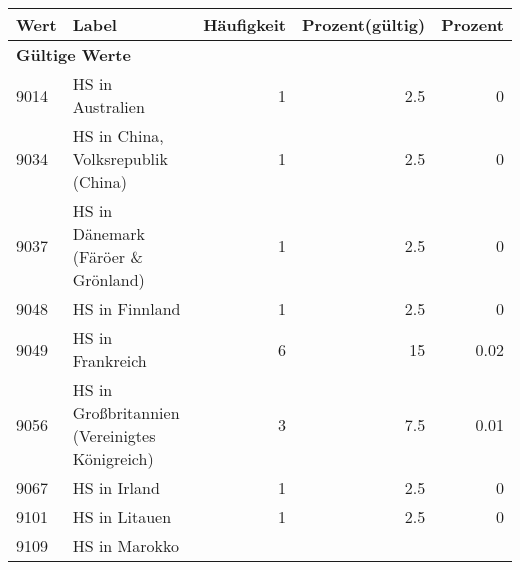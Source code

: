      \begin{longtable}{lXrrr}
     \toprule
     \textbf{Wert} & \textbf{Label} & \textbf{Häufigkeit} & \textbf{Prozent(gültig)} & \textbf{Prozent} \\
     \endhead
     \midrule
     \multicolumn{5}{l}{\textbf{Gültige Werte}}\\
        9014 & \multicolumn{1}{X}{HS in Australien} & %
          \num{1} &
          \num[round-mode=places,round-precision=2]{2.5} &
          \num[round-mode=places,round-precision=2]{0} \\
        9034 & \multicolumn{1}{X}{HS in China, Volksrepublik (China)} & %
          \num{1} &
          \num[round-mode=places,round-precision=2]{2.5} &
          \num[round-mode=places,round-precision=2]{0} \\
        9037 & \multicolumn{1}{X}{HS in Dänemark (Färöer \& Grönland)} & %
          \num{1} &
          \num[round-mode=places,round-precision=2]{2.5} &
          \num[round-mode=places,round-precision=2]{0} \\
        9048 & \multicolumn{1}{X}{HS in Finnland} & %
          \num{1} &
          \num[round-mode=places,round-precision=2]{2.5} &
          \num[round-mode=places,round-precision=2]{0} \\
        9049 & \multicolumn{1}{X}{HS in Frankreich} & %
          \num{6} &
          \num[round-mode=places,round-precision=2]{15} &
          \num[round-mode=places,round-precision=2]{0.02} \\
        9056 & \multicolumn{1}{X}{HS in Großbritannien (Vereinigtes Königreich)} & %
          \num{3} &
          \num[round-mode=places,round-precision=2]{7.5} &
          \num[round-mode=places,round-precision=2]{0.01} \\
        9067 & \multicolumn{1}{X}{HS in Irland} & %
          \num{1} &
          \num[round-mode=places,round-precision=2]{2.5} &
          \num[round-mode=places,round-precision=2]{0} \\
        9101 & \multicolumn{1}{X}{HS in Litauen} & %
          \num{1} &
          \num[round-mode=places,round-precision=2]{2.5} &
          \num[round-mode=places,round-precision=2]{0} \\
        9109 & \multicolumn{1}{X}{HS in Marokko} & %

\end{longtable}
